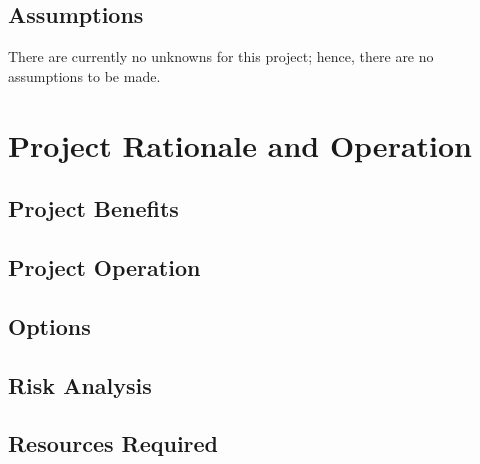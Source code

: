 \documentclass[11pt, a4paper, notitlepage]{report}
\begin{document}
\section{Assumptions}
There are currently no unknowns for this project; hence, there are no 
assumptions to be made.

\chapter{Project Rationale and Operation}
\section{Project Benefits}
\section{Project Operation}
\section{Options}
\section{Risk Analysis}
\section{Resources Required}
\end{document}
